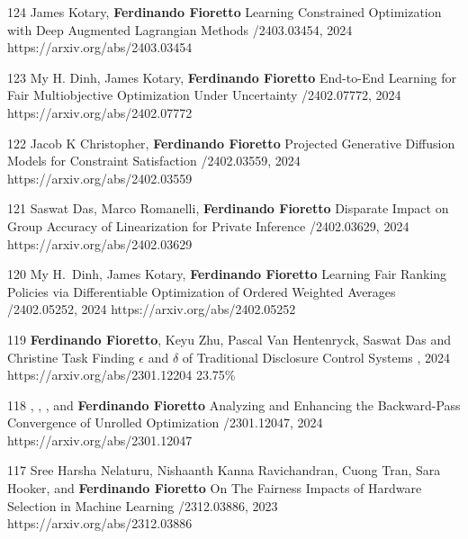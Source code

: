 \fi

\begin{pubs}

\wsentry
	{124}
	{\student{} James Kotary, {\bf Ferdinando Fioretto}}
	{Learning Constrained Optimization with Deep Augmented Lagrangian Methods}
	{/2403.03454, 2024}
	{https://arxiv.org/abs/2403.03454}

\wsentry
	{123}
	{\student{}My H. Dinh, \student{} James Kotary, {\bf Ferdinando Fioretto}}
	{End-to-End Learning for Fair Multiobjective Optimization Under Uncertainty}
	{/2402.07772, 2024}
	{https://arxiv.org/abs/2402.07772}

\wsentry
	{122}
	{\student{} Jacob K Christopher, {\bf Ferdinando Fioretto}}
  	{Projected Generative Diffusion Models for Constraint Satisfaction}
	{/2402.03559, 2024}
	{https://arxiv.org/abs/2402.03559}

\wsentry
	{121}
	{\student{} Saswat Das, Marco Romanelli, {\bf Ferdinando Fioretto}}
	{Disparate Impact on Group Accuracy of Linearization for Private Inference}
	{/2402.03629, 2024}
	{https://arxiv.org/abs/2402.03629}

\wsentry
	{120}
	{\student{} My H.~Dinh, \student{} James Kotary, {\bf Ferdinando Fioretto}}
	{Learning Fair Ranking Policies via Differentiable Optimization of Ordered Weighted Averages}
	{/2402.05252, 2024}
	{https://arxiv.org/abs/2402.05252}

\confentry
	{119}
	{{\bf Ferdinando Fioretto}, Keyu Zhu, Pascal Van Hentenryck, \student{} Saswat Das and Christine Task}
  	{Finding $\epsilon$ and $\delta$ of Traditional Disclosure Control Systems}
	{\procAAAI, 2024}
	{https://arxiv.org/abs/2301.12204}
	{23.75\%}

\wsentry
	{118}
	{, , ,
	and {\bf Ferdinando Fioretto}}
	{Analyzing and Enhancing the Backward-Pass Convergence of Unrolled Optimization}	
	{/2301.12047, 2024}
	{https://arxiv.org/abs/2301.12047}


\wsentry
	{117}
	{\student{} Sree Harsha Nelaturu, \student{} Nishaanth Kanna Ravichandran, \student{} Cuong Tran, Sara Hooker, and {\bf Ferdinando Fioretto}}
	{On The Fairness Impacts of Hardware Selection in Machine Learning}	
	{/2312.03886, 2023}
	{https://arxiv.org/abs/2312.03886}


\end{pubs}
